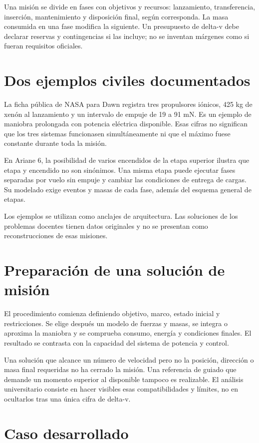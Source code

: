 Una misión se divide en fases con objetivos y recursos: lanzamiento, transferencia, inserción, mantenimiento y disposición final, según corresponda. La masa consumida en una fase modifica la siguiente. Un presupuesto de delta-v debe declarar reservas y contingencias si las incluye; no se inventan márgenes como si fueran requisitos oficiales.
\section{Dos ejemplos civiles documentados}
La ficha pública de NASA para Dawn registra tres propulsores iónicos, 425 kg de xenón al lanzamiento y un intervalo de empuje de 19 a 91 mN. Es un ejemplo de maniobra prolongada con potencia eléctrica disponible. Esas cifras no significan que los tres sistemas funcionasen simultáneamente ni que el máximo fuese constante durante toda la misión.\cite{DAWN}

En Ariane 6, la posibilidad de varios encendidos de la etapa superior ilustra que etapa y encendido no son sinónimos. Una misma etapa puede ejecutar fases separadas por vuelo sin empuje y cambiar las condiciones de entrega de cargas. Su modelado exige eventos y masas de cada fase, además del esquema general de etapas.\cite{ARIANE}

Los ejemplos se utilizan como anclajes de arquitectura. Las soluciones de los problemas docentes tienen datos originales y no se presentan como reconstrucciones de esas misiones.
\section{Preparación de una solución de misión}
El procedimiento comienza definiendo objetivo, marco, estado inicial y restricciones. Se elige después un modelo de fuerzas y masas, se integra o aproxima la maniobra y se comprueba consumo, energía y condiciones finales. El resultado se contrasta con la capacidad del sistema de potencia y control.

Una solución que alcance un número de velocidad pero no la posición, dirección o masa final requeridas no ha cerrado la misión. Una referencia de guiado que demande un momento superior al disponible tampoco es realizable. El análisis universitario consiste en hacer visibles esas compatibilidades y límites, no en ocultarlos tras una única cifra de delta-v.
\section{Caso desarrollado}

